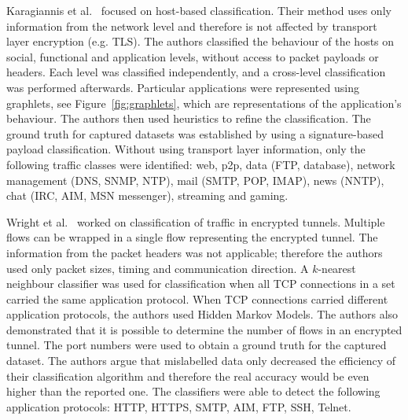 Karagiannis et al.~\cite{Karagiannis-2005-BLINC} focused on host-based classification. Their method uses only information from the network level and therefore is not affected by transport layer encryption (e.g. TLS). The authors classified the behaviour of the hosts on social, functional and application levels, without access to packet payloads or headers. Each level was classified independently, and a cross-level classification was performed afterwards. Particular applications were represented using graphlets, see Figure~\ref{fig:graphlets}, which are representations of the application’s behaviour. The authors then used heuristics to refine the classification. The ground truth for captured datasets was established by using a signature-based payload classification. Without using transport layer information, only the following traffic classes were identified: web, p2p, data (FTP, database), network management (DNS, SNMP, NTP), mail (SMTP, POP, IMAP), news (NNTP), chat (IRC, AIM, MSN messenger), streaming and gaming.

Wright et al.~\cite{Wright-2006-Inferring} worked on classification of traffic in encrypted tunnels. Multiple flows can be wrapped in a single flow representing the encrypted tunnel. The information from the packet headers was not applicable; therefore the authors used only packet sizes, timing and communication direction. A $k$-nearest neighbour classifier was used for classification when all TCP connections in a set carried the same application protocol. When TCP connections carried different application protocols, the authors used Hidden Markov Models. The authors also demonstrated that it is possible to determine the number of flows in an encrypted tunnel. The port numbers were used to obtain a ground truth for the captured dataset. The authors argue that mislabelled data only decreased the efficiency of their classification algorithm and therefore the real accuracy would be even higher than the reported one. The classifiers were able to detect the following application protocols: HTTP, HTTPS, SMTP, AIM, FTP, SSH, Telnet.

